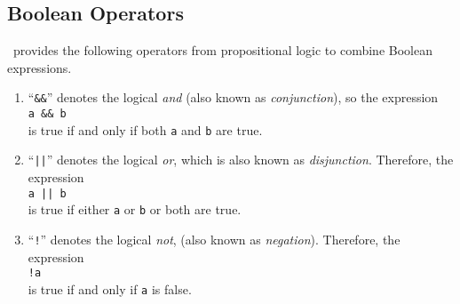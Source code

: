 \subsection{Boolean Operators}
\setlx\ provides the following operators from propositional logic to combine Boolean expressions.
\begin{enumerate}
\item ``\texttt{\&\&}'' denotes the logical \emph{and} (also known as \emph{conjunction}), so the expression
      \\[0.2cm]
      \hspace*{1.3cm}
      \texttt{a \&\& b}
      \\[0.2cm]
      is true if and only if both \texttt{a} and \texttt{b} are true.
\item ``\texttt{||}'' denotes the logical \emph{or}, which is also known as \emph{disjunction}.
      Therefore,  the expression
      \\[0.2cm]
      \hspace*{1.3cm}
      \texttt{a || b}
      \\[0.2cm]
      is true if either \texttt{a} or \texttt{b} or both are true.  
\item ``\texttt{!}'' denotes the logical \emph{not}, (also known as \emph{negation}).
      Therefore, the expression
      \\[0.2cm]
      \hspace*{1.3cm}
      \texttt{!a}
      \\[0.2cm]
      is true if and only if \texttt{a} is false.  


\end{enumerate}
